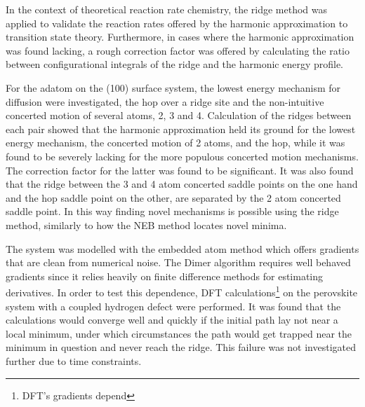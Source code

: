 In the context of theoretical reaction rate chemistry, the ridge method was applied to validate the reaction rates offered by the harmonic approximation to transition state theory.
Furthermore, in cases where the harmonic approximation was found lacking, a rough correction factor was offered by calculating the ratio between configurational integrals of the ridge and the harmonic energy profile.

For the  adatom on the (100) surface system, the lowest energy mechanism for diffusion were investigated, the hop over a ridge site and the non-intuitive concerted motion of several atoms, 2, 3 and 4.
Calculation of the ridges between each pair showed that the harmonic approximation held its ground for the lowest energy mechanism, the concerted motion of 2 atoms, and the hop, while it was found to be severely lacking for the more populous concerted motion mechanisms.
The correction factor for the latter was found to be significant.
It was also found that the ridge between the 3 and 4 atom concerted saddle points on the one hand and the hop saddle point on the other, are separated by the 2 atom concerted saddle point.
In this way finding novel mechanisms is possible using the ridge method, similarly to how the NEB method locates novel minima.

The  system was modelled with the embedded atom method which offers gradients that are clean from numerical noise.
The Dimer algorithm requires well behaved gradients since it relies heavily on finite difference methods for estimating derivatives.
In order to test this dependence, DFT calculations\footnote{DFT's gradients depend \expand} on the  perovskite system with a coupled hydrogen defect were performed.
\expand
It was found that the calculations would converge well and quickly if the initial path lay not near a local minimum, under which circumstances the path would get trapped near the minimum in question and never reach the ridge.
This failure was not investigated further due to time constraints.


